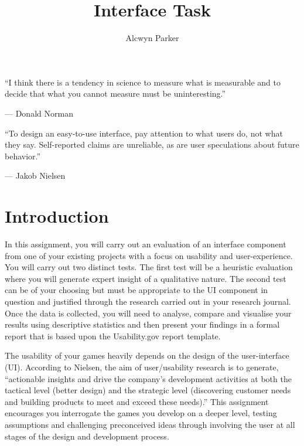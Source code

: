 \documentclass{../../fal_assignment}
\title{Interface Task}
\author{Alcwyn Parker}
\begin{document}
\maketitle

\begin{marginquote}
    ``I think there is a tendency in science to measure what is measurable and to decide that what you cannot measure must be uninteresting.''
    
    --- Donald Norman
    
    \marginquoterule
    
    ``To design an easy-to-use interface, pay attention to what users do, not what they say. Self-reported claims are unreliable, as are user speculations about future behavior.''
    
    --- Jakob Nielsen
\end{marginquote}

\section*{Introduction}

In this assignment, you will carry out an evaluation of an interface component from one of your existing projects with a focus on usability and user-experience. You will carry out two distinct tests. The first test will be a heuristic evaluation where you will generate expert insight of a qualitative nature. The second test can be of your choosing but must be appropriate to the UI component in question and justified through the research carried out in your research journal. Once the data is collected, you will need to analyse, compare and visualise your results using descriptive statistics and then present your findings in a formal report that is based upon the Usability.gov report template. 

The usability of your games heavily depends on the design of the user-interface (UI). According to Nielsen, the aim of user/usability research is to generate, ``actionable insights and drive the company's development activities at both the tactical level (better design) and the strategic level (discovering customer needs and building products to meet and exceed these needs).'' This assignment encourages you interrogate the games you develop on a deeper level, testing assumptions and challenging preconceived ideas through involving the user at all stages of the design and development process. 
\end{document}
